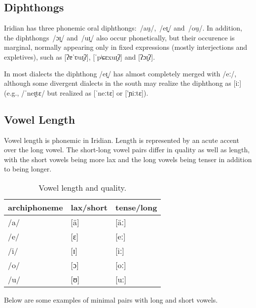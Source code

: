 \subsection{Diphthongs} Iridian has three phonemic oral
diphthongs: \,/au̯/, \,/eɪ̯/ and \,/ou̯/. In addition,
the diphthongs \,/ɔɪ̯/ and \,/uɪ̯/  also occur phonetically, but
their occurence is marginal, normally appearing only in fixed expressions
(mostly interjections and expletives), such as  [ʔɐˈʋuɪ̯ʔ],
 [ˈpʲɕɛxuɪ̯ʔ] and  [ʔɔɪ̯ʔ].

In most dialects the diphthong /eɪ̯/ has almost completely merged with 
/eː/, although some divergent dialects in the south may realize the diphthong as
[iː] (e.g.,  /ˈneɪ̯tɛ/ but realized as [ˈneːtɛ] or ['ɲiːtɛ]).

\subsection{Vowel Length}

Vowel length is phonemic in Iridian. Length is represented by an acute
accent over the long vowel. The short-long vowel pairs
differ in quality as well as length, with the short vowels being more lax and
the long vowels being tenser in addition to being longer.

\begin{table}
	\footnotesize\sffamily
	\caption{Vowel length and quality.}
	\medskip
	\begin{tabu} to 0.7
		\toprule
		{\sc archiphoneme} & {\sc lax/short} &{\sc tense/long}\\ \midrule
		/a/	& [\"a]	& [\"aː]		\\
		/e/	& [ɛ]	& [eː]		\\
		/i/	& [ɪ]	& [iː]		\\
		/o/	& [ɔ]	& [oː]		\\
		/u/	& [ʊ] & [uː]		\\
		\bottomrule
	\end{tabu}
\end{table}

Below are some examples of minimal pairs with long and short vowels.

\pex
{}

